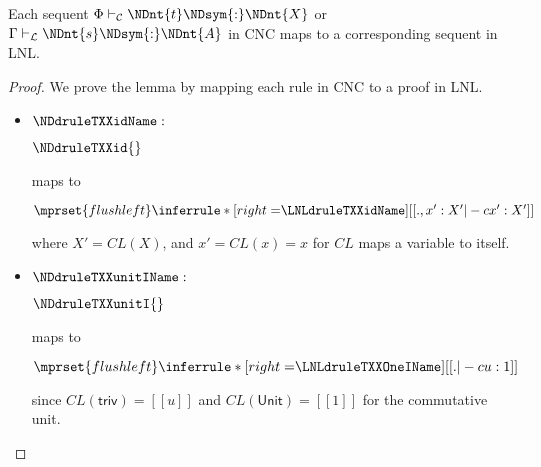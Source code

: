 \begin{lemma}
  Each sequent $\Phi  \vdash_\mathcal{C}  \NDnt{t}  \NDsym{:}  \NDnt{X}$ or $\Gamma  \vdash_\mathcal{L}  \NDnt{s}  \NDsym{:}  \NDnt{A}$ in CNC maps to a
  corresponding sequent in LNL.
\end{lemma}
\begin{proof}
  We prove the lemma by mapping each rule in CNC to a proof in LNL.
  \begin{itemize}
    \item $\NDdruleTXXidName:$
          \begin{center}
            \footnotesize
            $\NDdruleTXXid{}$
          \end{center}
          maps to
          \begin{center}
            \footnotesize
            \begin{math}
              $$\mprset{flushleft}
              \inferrule* [right=$\LNLdruleTXXidName$] {
                \\
              }{[[., x' : X' |-c x' : X']]}
            \end{math}
          \end{center}
          where $X'=CL(X)$, and $x'=CL(x)=x$ for $CL$ maps a variable to
          itself.

    \item $\NDdruleTXXunitIName:$
          \begin{center}
           \footnotesize
           $\NDdruleTXXunitI{}$
          \end{center}
          maps to
          \begin{center}
            \footnotesize
            \begin{math}
              $$\mprset{flushleft}
              \inferrule* [right=$\LNLdruleTXXOneIName$] {
                \\
              }{[[. |-c u : 1]]}
            \end{math}
          \end{center}
          since $CL( \mathsf{triv} ) = [[u]]$ and $CL( \mathsf{Unit} ) = [[1]]$ for
          the commutative unit.


\end{itemize}
\end{proof}
